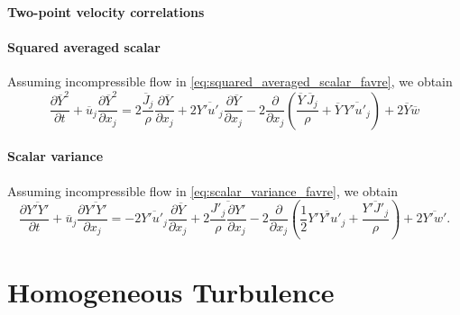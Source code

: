 \documentclass[oneside,a4paper,11pt]{report}
\newcommand{\uavg}{\overline{u}}
\newcommand{\wavg}{\overline{w}}
\newcommand{\Javg}{\overline{J}}
\newcommand{\Yavg}{\overline{Y}}
\newcommand{\ufluc}{u'}
\newcommand{\wfluc}{w'}
\newcommand{\Jfluc}{J'}
\newcommand{\Yfluc}{Y'}
\begin{document}
\subsection{Two-point velocity correlations}

\subsection{Squared averaged scalar}
Assuming incompressible flow in \cref{eq:squared_averaged_scalar_favre}, we obtain
\begin{equation}
    \frac{\partial \Yavg ^2}{\partial t} + \uavg_j \frac{\partial \Yavg^2}{\partial x_j} = 2\frac{ \Javg_j }{\rho} \frac{\partial \Yavg}{\partial x_j} + 2 \overline{ \Yfluc \ufluc_j } \frac{\partial \Yavg}{\partial x_j} - 2\frac{\partial}{\partial x_j} \left ( \frac{\Yavg \, \Javg_j }{\rho} + \Yavg \, \overline{ \Yfluc \ufluc_j } \right ) + 2 \Yavg \wavg
\end{equation}

\subsection{Scalar variance}
Assuming incompressible flow in \cref{eq:scalar_variance_favre}, we obtain 
\begin{equation}
    \label{eq:scalar_variance_rans}
    \frac{\partial \overline{ \Yfluc \Yfluc }}{\partial t} + \uavg_j \frac{\partial  \overline{ \Yfluc \Yfluc } }{\partial x_j} = -2 \overline{ \Yfluc \ufluc_j } \frac{\partial \Yavg}{\partial x_j} + 2 \overline{ \frac{\Jfluc_j}{\rho} \frac{\partial \Yfluc}{\partial x_j} } - 2 \frac{\partial}{\partial x_j} \left ( \frac{1}{2} \overline{ \Yfluc \Yfluc \ufluc_j } +  \frac{ \overline{ \Yfluc \Jfluc_j }}{\rho} \right) + 2 \overline{\Yfluc \wfluc}.
\end{equation}

\part{Homogeneous Turbulence}
%
\end{document}
